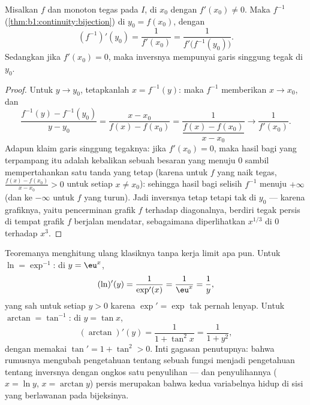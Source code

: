 \begin{theorem}\label{thm:b1:derivative:inverse}
Misalkan $f$  dan monoton tegas pada $I$, 
di $x_0$ dengan $f'(x_0) \neq 0$. Maka $f^{-1}$
(\cref{thm:b1:continuity:bijection})  di $y_0 =
f(x_0)$, dengan
\[
(f^{-1})'(y_0) = \frac{1}{f'(x_0)} = \frac{1}{f'\bigl(f^{-1}(y_0)\bigr)} .
\]
Sedangkan jika $f'(x_0) = 0$, maka inversnya mempunyai garis singgung tegak di $y_0$.
\end{theorem}

\begin{proof}
Untuk $y \to y_0$, tetapkanlah $x = f^{-1}(y)$: maka  $f^{-1}$ memberikan $x
\to x_0$, dan
\[
\frac{f^{-1}(y) - f^{-1}(y_0)}{y - y_0}
= \frac{x - x_0}{f(x) - f(x_0)}
= \frac{1}{\dfrac{f(x) - f(x_0)}{x - x_0}}
\longrightarrow \frac{1}{f'(x_0)} .
\]
Adapun klaim garis singgung tegaknya: jika $f'(x_0) = 0$, maka hasil bagi yang terpampang itu
adalah kebalikan sebuah besaran yang menuju $0$ sambil mempertahankan
satu tanda yang tetap (karena untuk $f$ yang naik tegas, $\frac{f(x) -
f(x_0)}{x - x_0} > 0$ untuk setiap $x \neq x_0$): sehingga hasil bagi selisih
$f^{-1}$ menuju $+\infty$ (dan ke $-\infty$
untuk $f$ yang turun). Jadi inversnya tetap  tetapi tak
 di $y_0$ --- karena grafiknya, yaitu pencerminan grafik $f$
terhadap diagonalnya, berdiri tegak persis di tempat grafik $f$ berjalan
mendatar, sebagaimana diperlihatkan $x^{1/3}$ di $0$ terhadap $x^3$.
\end{proof}

\begin{example}\label{ex:b1:derivative:inverseaction}
Teoremanya menghitung ulang  klasiknya tanpa kerja
limit apa pun. Untuk $\ln = \exp^{-1}$: di $y = \eu^x$,
\[
(\ln)'(y) = \frac{1}{\exp'(x)} = \frac{1}{\eu^{x}} = \frac1y ,
\]
yang sah untuk setiap $y > 0$ karena $\exp' = \exp$ tak pernah lenyap. Untuk
$\arctan = \tan^{-1}$: di $y = \tan x$,
\[
(\arctan)'(y) = \frac{1}{1 + \tan^2 x} = \frac{1}{1 + y^2} ,
\]
dengan memakai $\tan' = 1 + \tan^2 > 0$. Inti gagasan penutupnya: bahwa rumusnya
mengubah pengetahuan tentang sebuah fungsi menjadi pengetahuan tentang
inversnya dengan ongkos satu penyulihan --- dan
penyulihannya ($x = \ln y$, $x = \arctan y$) persis merupakan
 bahwa kedua variabelnya hidup di sisi yang berlawanan pada
bijeksinya.
\end{example}

